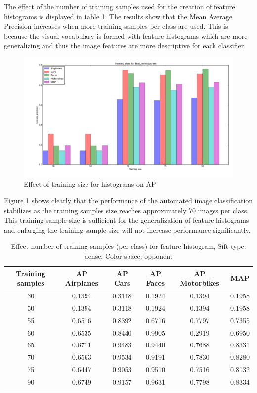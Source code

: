 The effect of the number of training samples used for the creation of feature histograms is displayed in table \ref{tab:size_hist}. The results show that the Mean Average Precision increases when more training samples per class are used. This is because the visual vocabulary is formed with feature histograms which are more generalizing and thus the image features are more descriptive for each classifier. 
\begin{figure}[H]
\includegraphics[width=\textwidth]{../plots/training_size_feature_histograms}
\caption{Effect of training size for histograms on AP}
\label{fig:size_hist}
\end{figure}
Figure \ref{fig:size_hist} shows clearly that the performance of the automated image classification stabilizes as the training samples size reaches approximately 70 images per class. This training sample size is sufficient for the generalization of feature histograms and enlarging the training sample size will not increase performance significantly. 

\begin{table}[H]
\begin{tabular}{|c|ccccc|}
\hline
\textbf{Training samples} & \textbf{AP Airplanes} & \textbf{AP Cars} & \textbf{AP Faces} & \textbf{AP Motorbikes} & \textbf{MAP}\\
\hline
30 & 0.1394 & 0.3118& 0.1924& 0.1394 & 0.1958\\
50 & 0.1394 & 0.3118& 0.1924& 0.1394 & 0.1958\\
55 & 0.6516 & 0.8392 & 0.6716 & 0.7797 & 0.7355\\
60 & 0.6535 & 0.8440 & 0.9905 & 0.2919 & 0.6950\\
65 & 0.6711 & 0.9483 & 0.9440 & 0.7688 & 0.8331\\
70 & 0.6563 & 0.9534 & 0.9191 & 0.7830 & 0.8280\\
75 & 0.6447 & 0.9053 & 0.9510 & 0.7516 & 0.8132\\
90 & 0.6749 & 0.9157 & 0.9631 & 0.7798 & 0.8334\\
\hline
\end{tabular}
\caption{Effect number of training samples (per class) for feature histogram, Sift type: dense, Color space: opponent}
\label{tab:size_hist}
\end{table}

